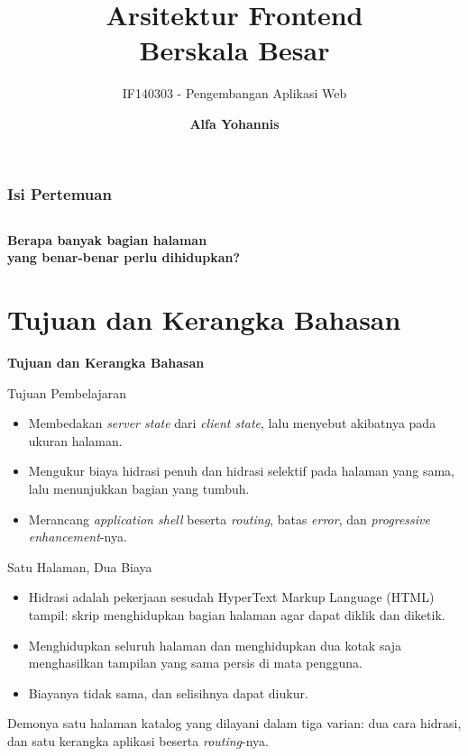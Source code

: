 \documentclass[aspectratio=169, table, 12pt]{beamer}
\title{\Huge Arsitektur Frontend\\ \vspace{10pt} Berskala Besar}
\subtitle{IF140303 - Pengembangan Aplikasi Web}
\author{\textbf{Alfa Yohannis}}
\begin{document}
\frame{\titlepage}

\begin{frame}[fragile]
  \frametitle{Isi Pertemuan}
  \vspace{14pt}
  \begin{columns}[t]
    {\small\tableofcontents[sections={1-7}]}

    {\small\tableofcontents[sections={8-14}]}
  \end{columns}
\end{frame}

\begin{frame}{\hfill}
  \centering
  \Huge{\textbf{Berapa banyak bagian halaman\\yang benar-benar perlu
  dihidupkan?}}
\end{frame}

\section{Tujuan dan Kerangka Bahasan}

\begin{frame}{\hfill}
  \centering
  \Huge{\textbf{Tujuan dan Kerangka Bahasan}}
\end{frame}

\begin{frame}{{\Large Tujuan Pembelajaran}}
  \vspace{10pt}
  \begin{itemize}
    \item Membedakan \textit{server state} dari \textit{client state}, lalu
          menyebut akibatnya pada ukuran halaman.
    \item Mengukur biaya hidrasi penuh dan hidrasi selektif pada halaman yang
          sama, lalu menunjukkan bagian yang tumbuh.
    \item Merancang \textit{application shell} beserta \textit{routing},
          batas \textit{error}, dan \textit{progressive enhancement}-nya.
  \end{itemize}
\end{frame}

\begin{frame}{{\Large Satu Halaman, Dua Biaya}}
  \vspace{12pt}
  \begin{itemize}
    \item Hidrasi adalah pekerjaan sesudah HyperText Markup Language (HTML) tampil: skrip menghidupkan
          bagian halaman agar dapat diklik dan diketik.
    \item Menghidupkan seluruh halaman dan menghidupkan dua kotak saja
          menghasilkan tampilan yang sama persis di mata pengguna.
    \item Biayanya tidak sama, dan selisihnya dapat diukur.
  \end{itemize}
  \vspace{10pt}
  {\small Demonya satu halaman katalog yang dilayani dalam tiga varian: dua
  cara hidrasi, dan satu kerangka aplikasi beserta \textit{routing}-nya.}
\end{frame}
\end{document}
